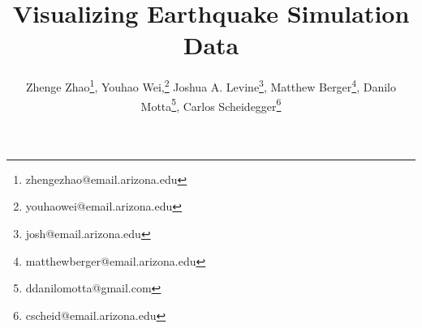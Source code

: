 \documentclass{vgtc}                %
\title{Visualizing Earthquake Simulation Data}
\author{Zhenge Zhao\thanks{zhengezhao@email.arizona.edu}, Youhao Wei,\thanks{youhaowei@email.arizona.edu} Joshua A. Levine\thanks{josh@email.arizona.edu}, Matthew Berger\thanks{matthewberger@email.arizona.edu}, Danilo Motta\thanks{ddanilomotta@gmail.com}, Carlos Scheidegger\thanks{cscheid@email.arizona.edu}}
\begin{document}



\label{sec:myintro}
\maketitle



%





%

%



%


\end{document}
